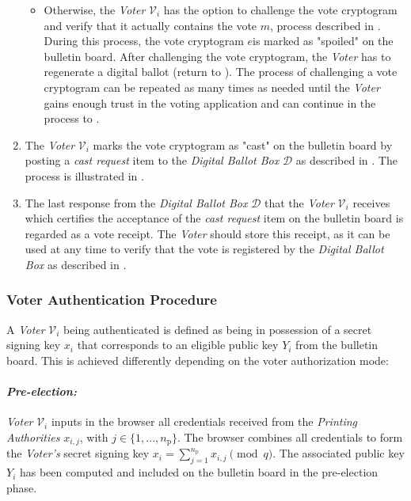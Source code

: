 \begin{enumerate}
\begin{itemize}
        \item Otherwise, the \textit{Voter} $\mathcal{V}_i$ has the option to challenge the vote cryptogram and verify that it actually contains the vote $m$, process described in . During this process, the vote cryptogram $e$is marked as "spoiled" on the bulletin board. After challenging the vote cryptogram, the \textit{Voter} has to regenerate a digital ballot (return to ). The process of challenging a vote cryptogram can be repeated as many times as needed until the \textit{Voter} gains enough trust in the voting application and can continue in the process to .
    \end{itemize}
    
    \item \label{itm: cast vote} The \textit{Voter} $\mathcal{V}_i$ marks the vote cryptogram as "cast" on the bulletin board by posting a \textit{cast request} item to the \textit{Digital Ballot Box} $\mathcal{D}$ as described in . The process is illustrated in .
    
    \item The last response from the \textit{Digital Ballot Box} $\mathcal{D}$ that the \textit{Voter} $\mathcal{V}_i$ receives which certifies the acceptance of the \textit{cast request} item on the bulletin board is regarded as a vote receipt. The \textit{Voter} should store this receipt, as it can be used at any time to verify that the vote is registered by the \textit{Digital Ballot Box} as described in .
\end{enumerate}


\subsubsection{Voter Authentication Procedure} \label{sec: voter authentication procedure}
A \textit{Voter} $\mathcal{V}_i$ being authenticated is defined as being in possession of a secret signing key \( x_i \) that corresponds to an eligible public key \( Y_i \) from the bulletin board. This is achieved differently depending on the voter authorization mode:

\paragraph{\textit{Pre-election:}}
\textit{Voter} $\mathcal{V}_i$ inputs in the browser all credentials received from the \textit{Printing Authorities} $x_{i, j}$, with \( j \in \{ 1, ..., n_\mathrm{p} \} \). The browser combines all credentials to form the \textit{Voter's} secret signing key \( x_i = \sum_{j=1}^{n_\mathrm{p}} x_{i, j} \pmod q \). The associated public key \( Y_i \) has been computed and included on the bulletin board in the pre-election phase.

